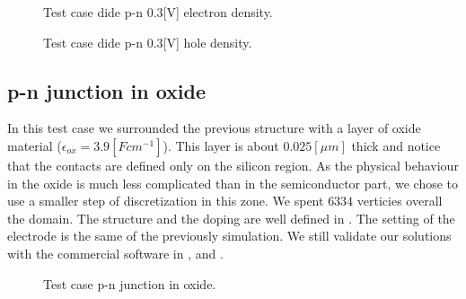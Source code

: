 \begin{figure}[!h]
\centering
{}
\hspace{0.5cm}
\hspace{0.5cm}
\caption{Test case dide p-n 0.3[V] electron density.}
\label{fig: ndensity}
\end{figure}

\begin{figure}[!h]
\centering
{}
\hspace{0.5cm}
\hspace{0.5cm}
\caption{Test case dide p-n 0.3[V] hole density.}
\label{fig: pdensity}
\end{figure}


\clearpage


\subsection{p-n junction in oxide}

In this test case we surrounded the previous structure with a layer of oxide material ($\epsilon_{ox} = 3.9 [F cm^{-1}]$). This layer is about $0.025[\mu m]$ thick and notice that the contacts are defined only on the silicon region. As the physical behaviour in the oxide is much less complicated than in the semiconductor part, we chose to use a smaller step of discretization in this zone. We spent $6334$ verticies overall the domain. The structure and the doping are well defined in . The setting of the electrode is the same of the previously simulation. We still validate our solutions with the commercial software in ,  and .  



\begin{figure}[!h]
\centering
{}
\hspace{1.5cm}
\caption{Test case p-n junction in oxide.}
\label{fig: structure diodeox}
\end{figure}



